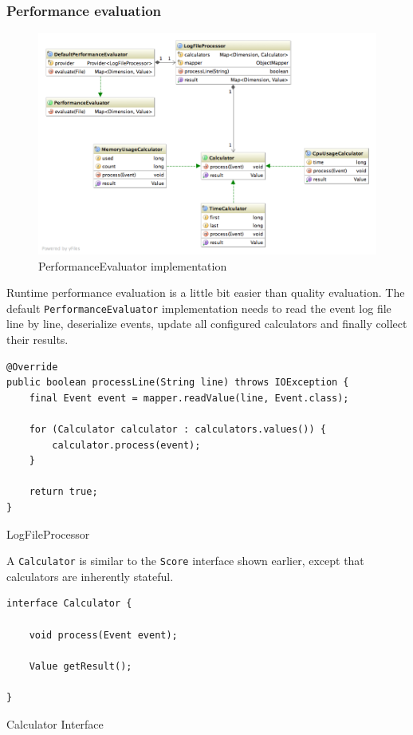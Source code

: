 \newpage
\subsubsection{Performance evaluation}
\begin{figure}[H]
\centering
\includegraphics[width=\textwidth, trim=20px 20px 0 0, clip=true]{performance-evaluation.png}
\caption{PerformanceEvaluator implementation}
\end{figure}

Runtime performance evaluation is a little bit easier than quality evaluation. The default \texttt{PerformanceEvaluator} implementation needs to read the event log file line by line, deserialize events, update all configured calculators and finally collect their results.

\begin{listing}[H]
\begin{verbatim}
@Override
public boolean processLine(String line) throws IOException {
    final Event event = mapper.readValue(line, Event.class);

    for (Calculator calculator : calculators.values()) {
        calculator.process(event);
    }

    return true;
}
\end{verbatim}
\caption{LogFileProcessor}
\end{listing}

A \texttt{Calculator} is similar to the \texttt{Score} interface shown earlier, except that calculators are inherently stateful.

\begin{listing}[H]
\begin{verbatim}
interface Calculator {

    void process(Event event);

    Value getResult();

}
\end{verbatim}
\caption{Calculator Interface}
\label{lst:calculator}
\end{listing}

